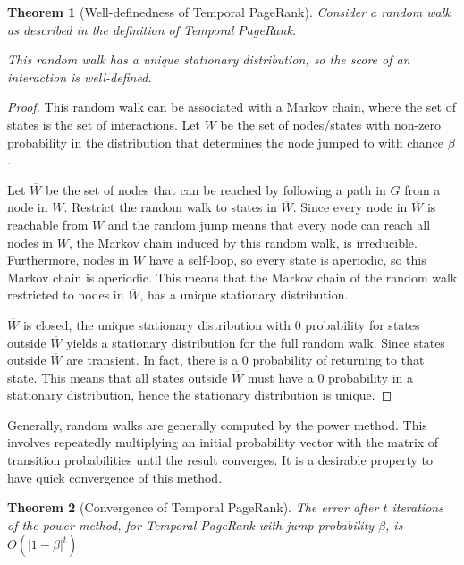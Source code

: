\documentclass[a4paper,11pt]{book}
\newcommand{\ov}{\overline}
\newtheorem{theorem}{Theorem}
\theoremstyle{definition}
\begin{document}
\begin{theorem}[Well-definedness of Temporal PageRank]
    Consider a random walk as described in the definition of Temporal PageRank.

    This random walk has a unique stationary distribution, so the score of an interaction is well-defined.
    \label{thm:well_defined}
\end{theorem}
\begin{proof}
    This random walk can be associated with a Markov chain, where the set of states is the set of
    interactions. Let $W$ be the set of nodes/states with non-zero probability in the distribution
    that determines the node jumped to with chance $\beta$.

    Let $\ov{W}$ be the set of nodes that can be reached by following a path in $G$ from a node
    in $W$. Restrict the random walk to states in $\ov{W}$. Since every node in $\ov{W}$ is reachable
    from $W$ and the random jump means that every node can reach all nodes in $W$, the Markov chain
    induced by this random walk, is irreducible. Furthermore, nodes in $W$ have a self-loop, so every
    state is aperiodic, so this Markov chain is aperiodic. This means that the Markov chain of the
    random walk restricted to nodes in $\ov{W}$, has a unique stationary distribution.

    $\ov{W}$ is closed, the unique stationary distribution with $0$ probability for states outside
    $\ov{W}$ yields a stationary distribution for the full random walk. Since states
    outside $\ov{W}$ are transient. In fact, there is a $0$ probability of returning to that
    state. This means that all states outside $\ov{W}$ must have a $0$ probability in a stationary
    distribution, hence the stationary distribution is unique.
\end{proof}

Generally, random walks are generally computed by the power method. This involves repeatedly
multiplying an initial probability vector with the matrix of transition probabilities until
the result converges. It is a desirable property to have quick convergence of this method.

\begin{theorem}[Convergence of Temporal PageRank]
    The error after $t$ iterations of the power method, for Temporal PageRank with
    jump probability $\beta$, is $O(|1-\beta|^t)$
    \label{thm:conv_tpr}
\end{theorem}
\end{document}
